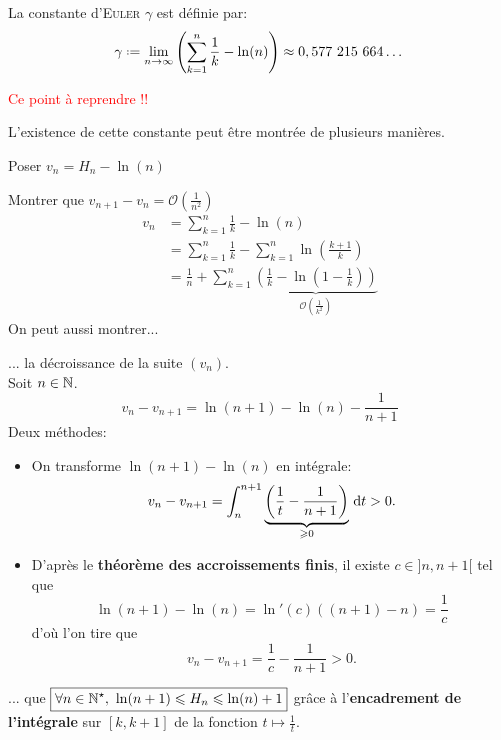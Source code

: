 \begin{defi}
    La constante d'\textsc{Euler} $\gamma$ est définie par:
    $$\gamma \defeq \lim_{n \to \infty} \left(\sum_{k=1}^{n} \frac{1}{k} - \ln(n) \right) \approx 0,577\ 215\ 664 \dots$$
\end{defi}

\begin{marginfigure}[-3cm]
	
\end{marginfigure}

\textcolor{red}{Ce point à reprendre !!}

L'existence de cette constante peut être montrée de plusieurs manières.

\begin{preuve}
    \item Poser $v_n = H_n - \ln(n)$
    \item Montrer que $v_{n+1}-v_n = \mathcal{O}\left(\frac{1}{n^2}\right)$\\
    \begin{align*}
        v_n &= \sum_{k=1}^n\frac{1}{k} -\ln(n) \\
        &= \sum_{k=1}^n \frac{1}{k} -\sum_{k=1}^n  \ln\left( \frac{k+1}{k} \right) \\
        &= \frac{1}{n} + \sum_{k=1}^n \underbrace{\left( \frac{1}{k} - \ln\left(1-\frac{1}{k}\right)\right)}_{\mathcal{O}\left(\frac{1}{k^2}\right)}
    \end{align*}
    On peut aussi montrer...
    \item ... la décroissance de la suite $(v_n)$. \\
    Soit $n \in \mathbb{N}$. 
    $$v_n - v_{n+1} = \ln(n+1) - \ln(n) - \frac{1}{n+1}$$
    Deux méthodes:
    \begin{itemize}
        \item On transforme $\ln(n+1) - \ln(n)$ en intégrale:
        $$v_n - v_{n+1} = \int_{n}^{n+1} \underbrace{\left( \frac{1}{t} - \frac{1}{n+1} \right)}_{\geqslant 0} \, \mathrm{d} t > 0.$$
        \item D'après le \textbf{théorème des accroissements finis}, il existe $c \in ]n, n+1[$ tel que 
        $$\ln(n+1) - \ln(n) = \ln'(c)((n+1) - n) = \frac{1}{c}$$
        d'où l'on tire que 
        $$v_n - v_{n+1} = \frac{1}{c} - \frac{1}{n+1} > 0.$$
    \end{itemize}
    \item ... que $\boxed{\forall n \in \Ne,\ \ln(n+1) \leqslant H_n \leqslant \ln(n) + 1}$ grâce à l'\textbf{encadrement de l'intégrale} sur $[k, k+1]$ de la fonction $t \mapsto \frac{1}{t}$.
\end{preuve}

